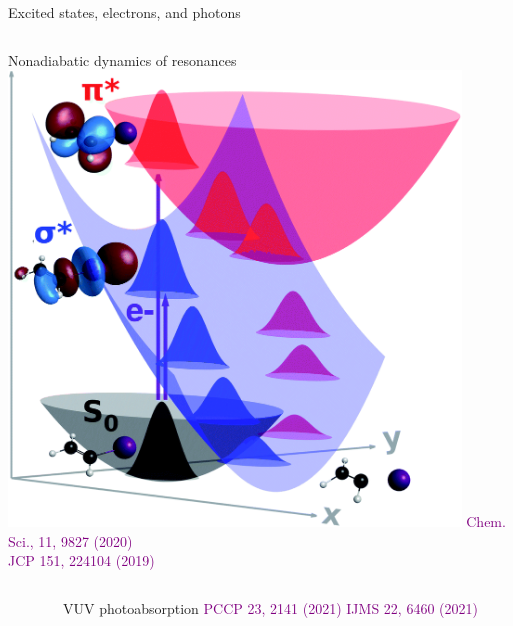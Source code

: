 \documentclass[aspectratio=169,9pt]{beamer}
\newcommand{\pub}[1]{{\small \textcolor{purple}{#1}}}
\begin{document}
\begin{frame}{Excited states, electrons, and photons}
\begin{columns}
        \begin{column}{0.32\textwidth}
		\vspace{-0.5cm}
	\begin{block}{Nonadiabatic dynamics of resonances}
 	\includegraphics[width=0.9\textwidth]{fig/pes_complex.png}
	\pub{Chem. Sci., 11, 9827 (2020)}
		\\
	\pub{JCP 151, 224104 (2019)}
        \end{block}

        \end{column}

        \end{columns}

        \begin{columns}
        \begin{column}{0.32\textwidth}
        \end{column}

        \begin{column}{0.68\textwidth}
		\vspace{-0.5cm}
 	\begin{block}{VUV photoabsorption}
		\pub{PCCP 23, 2141 (2021)}
		\hspace{2cm}
		\pub{IJMS 22, 6460 (2021)}
        \end{block}
        \end{column}
        \end{columns}

\end{frame}
\end{document}
